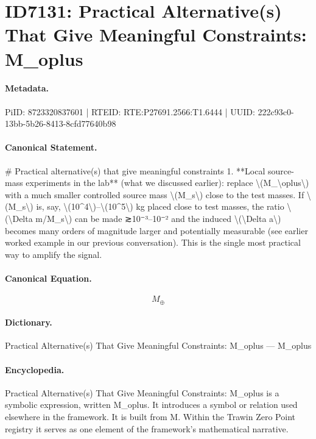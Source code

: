\section*{ID7131: Practical Alternative(s) That Give Meaningful Constraints: M\_oplus}
\paragraph{Metadata.}
PiID: 8723320837601 | RTEID: RTE:P27691.2566:T1.6444 | UUID: 222c93c0-13bb-5b26-8413-8cfd77640b98

\paragraph{Canonical Statement.}
\# Practical alternative(s) that give meaningful constraints 1. **Local source-mass experiments in the lab** (what we discussed earlier): replace \textbackslash{}(M\_\textbackslash{}oplus\textbackslash{}) with a much smaller controlled source mass \textbackslash{}(M\_s\textbackslash{}) close to the test masses. If \textbackslash{}(M\_s\textbackslash{}) is, say, \textbackslash{}(10\textasciicircum{}4\textbackslash{})–\textbackslash{}(10\textasciicircum{}5\textbackslash{}) kg placed close to test masses, the ratio \textbackslash{}(\textbackslash{}Delta m/M\_s\textbackslash{}) can be made ≳10⁻³–10⁻² and the induced \textbackslash{}(\textbackslash{}Delta a\textbackslash{}) becomes many orders of magnitude larger and potentially measurable (see earlier worked example in our previous conversation). This is the single most practical way to amplify the signal.

\paragraph{Canonical Equation.}
\[
M_\oplus
\]

\paragraph{Dictionary.}
Practical Alternative(s) That Give Meaningful Constraints: M\_oplus — M\_oplus

\paragraph{Encyclopedia.}
Practical Alternative(s) That Give Meaningful Constraints: M\_oplus is a symbolic expression, written M\_oplus. It introduces a symbol or relation used elsewhere in the framework. It is built from M. Within the Trawin Zero Point registry it serves as one element of the framework's mathematical narrative.
